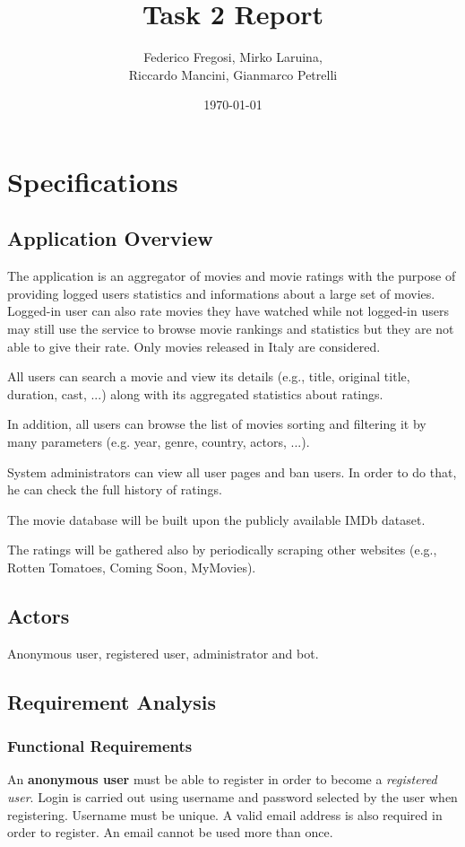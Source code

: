 \documentclass[10pt]{article}
\title{Task 2 Report}
\date{\today}
\author{Federico Fregosi, Mirko Laruina,\\
        Riccardo Mancini, Gianmarco Petrelli}
\begin{document}
\maketitle
\vfill
\tableofcontents
\vfill
\clearpage
\setcounter{page}{1}

\section{Specifications}

\subsection{Application Overview}
The application is an aggregator of movies and movie ratings with the purpose 
of providing logged users statistics and informations about a large set of movies.
Logged-in user can also rate movies they have watched while not logged-in users 
may still use the service to browse movie rankings and statistics but they are not
able to give their rate. Only movies released in Italy are considered.

All users can search a movie and view its details (e.g., title, original title, duration, 
cast, ...) along with its aggregated statistics about ratings. 

In addition, all users can browse the list of movies sorting and filtering it by many parameters
(e.g. year, genre, country, actors, ...).

System administrators can view all user pages and ban users. In order to do that, he can 
check the full history of ratings.

The movie database will be built upon the publicly available IMDb dataset.

The ratings will be gathered also by periodically scraping other websites 
(e.g., Rotten Tomatoes, Coming Soon, MyMovies).

\subsection{Actors}
Anonymous user, registered user, administrator and bot.

\subsection{Requirement Analysis}

\subsubsection{Functional Requirements}
An \textbf{anonymous user} must be able to register in order to become a 
\textit{registered user}. Login is carried out using username and password selected 
by the user when registering. Username must be unique. A valid email address is
also required in order to register. An email cannot be used more than once.
\end{document}
